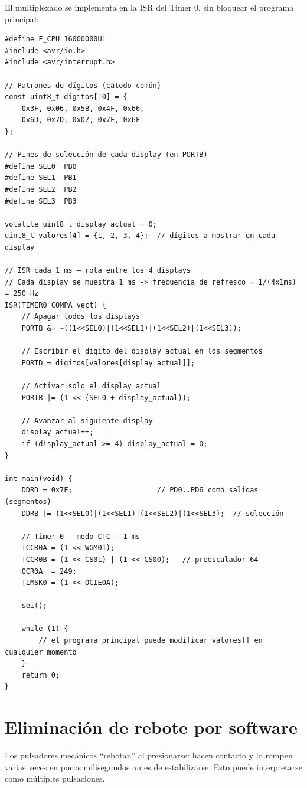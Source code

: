 El multiplexado se implementa en la ISR del Timer 0, sin bloquear el programa
principal:

\begin{lstlisting}[style=estilo-c]
#define F_CPU 16000000UL
#include <avr/io.h>
#include <avr/interrupt.h>

// Patrones de dígitos (cátodo común)
const uint8_t digitos[10] = {
    0x3F, 0x06, 0x5B, 0x4F, 0x66,
    0x6D, 0x7D, 0x07, 0x7F, 0x6F
};

// Pines de selección de cada display (en PORTB)
#define SEL0  PB0
#define SEL1  PB1
#define SEL2  PB2
#define SEL3  PB3

volatile uint8_t display_actual = 0;
uint8_t valores[4] = {1, 2, 3, 4};  // dígitos a mostrar en cada display

// ISR cada 1 ms — rota entre los 4 displays
// Cada display se muestra 1 ms -> frecuencia de refresco = 1/(4x1ms) = 250 Hz
ISR(TIMER0_COMPA_vect) {
    // Apagar todos los displays
    PORTB &= ~((1<<SEL0)|(1<<SEL1)|(1<<SEL2)|(1<<SEL3));

    // Escribir el dígito del display actual en los segmentos
    PORTD = digitos[valores[display_actual]];

    // Activar solo el display actual
    PORTB |= (1 << (SEL0 + display_actual));

    // Avanzar al siguiente display
    display_actual++;
    if (display_actual >= 4) display_actual = 0;
}

int main(void) {
    DDRD = 0x7F;                    // PD0..PD6 como salidas (segmentos)
    DDRB |= (1<<SEL0)|(1<<SEL1)|(1<<SEL2)|(1<<SEL3);  // selección

    // Timer 0 — modo CTC — 1 ms
    TCCR0A = (1 << WGM01);
    TCCR0B = (1 << CS01) | (1 << CS00);   // preescalador 64
    OCR0A  = 249;
    TIMSK0 = (1 << OCIE0A);

    sei();

    while (1) {
        // el programa principal puede modificar valores[] en cualquier momento
    }
    return 0;
}
\end{lstlisting}

\section{Eliminación de rebote por software}

Los pulsadores mecánicos ``rebotan'' al presionarse: hacen contacto y lo rompen
varias veces en pocos milisegundos antes de estabilizarse. Esto puede interpretarse
como múltiples pulsaciones.

